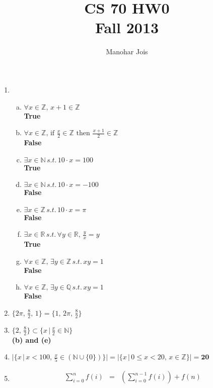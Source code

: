 \documentclass[12pt]{article}
\title{CS 70 HW0 \\ Fall 2013}
\author{Manohar Jois}
\date{}
\begin{document}
    \maketitle
    \begin{enumerate}[1.]
        \item \begin{enumerate}[(a)]
            \item $\forall x \in \mathbb{Z},\, x+1 \in \mathbb{Z}$ \\ \textbf{True}
            \item $\forall x \in \mathbb{Z},\, \text{if } \frac{x}{2} \in \mathbb{Z}
                \text{ then } \frac{x+1}{2} \in \mathbb{Z}$ \\ \textbf{False}
            \item $\exists x \in \mathbb{N}\, s.t.\, 10 \cdot x = 100$ \\ \textbf{True}
            \item $\exists x \in \mathbb{N}\, s.t.\, 10 \cdot x = -100$ \\ \textbf{False}
            \item $\exists x \in \mathbb{Z}\, s.t.\, 10 \cdot x = \pi$ \\ \textbf{False}
            \item $\exists x \in \mathbb{R}\, s.t.\, \forall y \in \mathbb{R},\,
                \frac{y}{x} = y$ \\ \textbf{True}
            \item $\forall x \in \mathbb{Z},\, \exists y \in \mathbb{Z}\,
                s.t.\, xy = 1$ \\ \textbf{False}
            \item $\forall x \in \mathbb{Z},\, \exists y \in \mathbb{Q}\,
                s.t.\, xy = 1$ \\ \textbf{False}
            \end{enumerate}
        \item $\{2\pi,\, \frac{8}{2},\, 1\} = \{1,\, 2\pi,\, \frac{8}{2}\}$
        \item $\{2,\, \frac{8}{2}\} \subset \{x\, |\, \frac{x}{2} \in \mathbb{N}\}$ \\
            \textbf{(b) and (e)}
        \item $|\{x\, |\, x < 100,\, \frac{x}{5} \in (\mathbb{N} \cup \{0\})\}|
            = |\{x\, |\, 0 \leq x < 20,\, x \in \mathbb{Z}\}| = \textbf{20}$
        \item \begin{eqnarray*}
            \sum_{i=0}^{n} f(i) & = & \left(\sum_{i=0}^{n-1} f(i)\right) + f(n) \\

\end{eqnarray*}
\end{enumerate}
\end{document}
